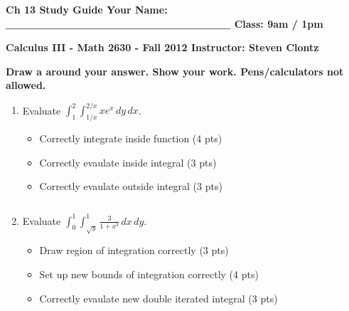 \documentclass[12pt]{article}
\newcommand{\up}{$~$\vspace*{-0.7in}}
\newcommand{\liner}{\noindent\underline{\hspace*{7in}}}
\newcommand{\spac}{\hspace*{3em}}
\newcommand{\ds}{\displaystyle}
\begin{document}
\up

{\bf Ch 13 Study Guide  \hspace*{1em} Your Name: \_\_\_\_\_\_\_\_\_\_\_\_\_\_\_\_\_\_\_\_\_\_\_\_\_\_ \hspace*{1em} Class: 9am / 1pm}

\vspace*{0.2in}

\centerline{ \bf Calculus III - Math 2630 - Fall 2012 \spac Instructor: Steven Clontz}

\vspace*{0.2in}

{\bf Draw a  around your answer. Show your work. Pens/calculators not allowed.}

\indent\liner


\begin{enumerate}


\item Evaluate $\ds \int_{1}^{2}\int_{1/x}^{2/x} xe^x \,dy\,dx$.

  \begin{itemize}
  \item Correctly integrate inside function (4 pts)
  \item Correctly evaulate inside integral (3 pts)
  \item Correctly evaulate outside integral (3 pts)
  \end{itemize}

\vspace*{6in}

\liner

\newpage\up


\item Evaluate $\ds \int_{0}^{1}\int_{\sqrt{y}}^{1} \frac{3}{1+x^3}\,dx\,dy$.

  \begin{itemize}
  \item Draw region of integration correctly (3 pts)
  \item Set up new bounds of integration correctly (4 pts)
  \item Correctly evaulate new double iterated integral (3 pts)
  \end{itemize}

\vspace*{8in}

\liner


\end{enumerate}
\end{document}
